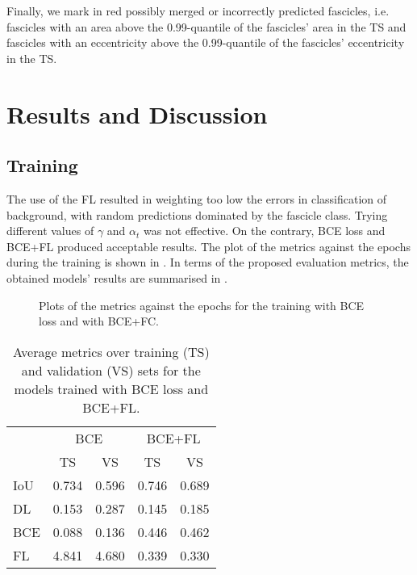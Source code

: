 \documentclass[conference]{IEEEtran}
\begin{document}
Finally, we mark in red possibly merged or incorrectly predicted fascicles, i.e. fascicles with an area above the 0.99-quantile of the fascicles’ area in the TS and fascicles with an eccentricity above the 0.99-quantile of the fascicles’ eccentricity in the TS. 

\section{Results and Discussion}
\subsection{Training}
The use of the FL resulted in weighting too low the errors in classification of background, with random predictions dominated by the fascicle class. Trying different values of $\gamma$ and $\alpha_t$ was not effective. 
On the contrary, BCE loss and BCE+FL produced acceptable results. The plot of the metrics against the epochs during the training is shown in . In terms of the proposed evaluation metrics, the obtained models' results are summarised in . 

\begin{figure}[ht]
\caption{Plots of the metrics against the epochs for the training with BCE loss and with BCE+FC.}
\label{fig:metrics}
\end{figure}

\begin{table}[h]
\caption{Average metrics over training (TS) and validation (VS) sets for the models trained with BCE loss and BCE+FL.}
\label{tab:result}
\centering
\begin{tabular}{lcccc}
 &\multicolumn{2}{c}{BCE} &\multicolumn{2}{c}{BCE+FL} \\
 & TS & VS & TS & VS \\
 \midrule
 IoU & 0.734 & 0.596 & 0.746 & 0.689 \\
 DL	& 0.153 & 0.287 & 0.145 & 0.185\\
 BCE & 0.088 & 0.136 & 0.446 & 0.462 \\
 FL	& 4.841	& 4.680	& 0.339	& 0.330 \\
 \bottomrule
\end{tabular}
\end{table}
\end{document}
